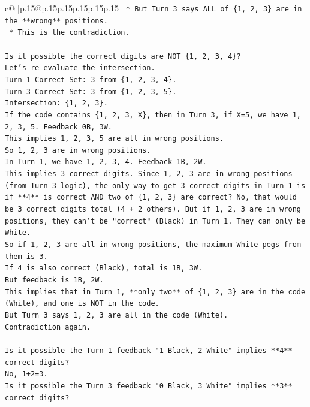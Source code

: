 \documentclass{article}
\begin{document}
{\begin{supertabular}{c@{$\;$}|p{.15\linewidth}@{}p{.15\linewidth}p{.15\linewidth}p{.15\linewidth}p{.15\linewidth}p{.15\linewidth}}
{{{\texttt{    *   But Turn 3 says ALL of \{1, 2, 3\} are in the **wrong** positions.} \\
\texttt{    *   This is the contradiction.} \\
\\ 
\texttt{Is it possible the correct digits are NOT \{1, 2, 3, 4\}?} \\
\texttt{Let's re{-}evaluate the intersection.} \\
\texttt{Turn 1 Correct Set: 3 from \{1, 2, 3, 4\}.} \\
\texttt{Turn 3 Correct Set: 3 from \{1, 2, 3, 5\}.} \\
\texttt{Intersection: \{1, 2, 3\}.} \\
\texttt{If the code contains \{1, 2, 3, X\}, then in Turn 3, if X=5, we have 1, 2, 3, 5. Feedback 0B, 3W.} \\
\texttt{This implies 1, 2, 3, 5 are all in wrong positions.} \\
\texttt{So 1, 2, 3 are in wrong positions.} \\
\texttt{In Turn 1, we have 1, 2, 3, 4. Feedback 1B, 2W.} \\
\texttt{This implies 3 correct digits. Since 1, 2, 3 are in wrong positions (from Turn 3 logic), the only way to get 3 correct digits in Turn 1 is if **4** is correct AND two of \{1, 2, 3\} are correct? No, that would be 3 correct digits total (4 + 2 others). But if 1, 2, 3 are in wrong positions, they can't be "correct" (Black) in Turn 1. They can only be White.} \\
\texttt{So if 1, 2, 3 are all in wrong positions, the maximum White pegs from them is 3.} \\
\texttt{If 4 is also correct (Black), total is 1B, 3W.} \\
\texttt{But feedback is 1B, 2W.} \\
\texttt{This implies that in Turn 1, **only two** of \{1, 2, 3\} are in the code (White), and one is NOT in the code.} \\
\texttt{But Turn 3 says 1, 2, 3 are all in the code (White).} \\
\texttt{Contradiction again.} \\
\\ 
\texttt{Is it possible the Turn 1 feedback "1 Black, 2 White" implies **4** correct digits?} \\
\texttt{No, 1+2=3.} \\
\texttt{Is it possible the Turn 3 feedback "0 Black, 3 White" implies **3** correct digits?} \\
}}}
\end{supertabular}}
\end{document}
